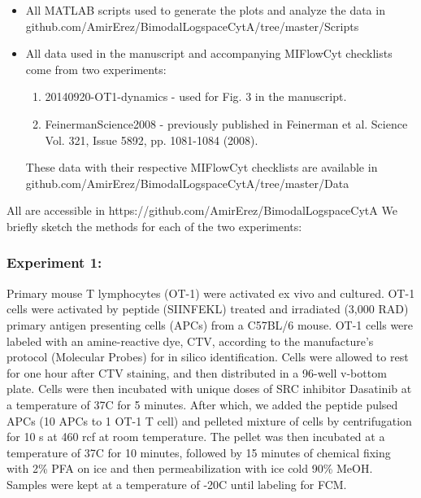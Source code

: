 \documentclass[11pt,a4paper,draft]{article}
\begin{document}
\smallskip
\begin{itemize}
\item All MATLAB scripts used to generate the plots and analyze the data in 
github.com/AmirErez/BimodalLogspaceCytA/tree/master/Scripts 
\item All data used in the manuscript and accompanying MIFlowCyt checklists come from two experiments:
	\begin{enumerate}
	\item 20140920-OT1-dynamics - used for Fig. 3 in the manuscript.
	\item FeinermanScience2008 - previously published in Feinerman et al. Science Vol. 321, Issue 5892, pp. 1081-1084 (2008). 
	\end{enumerate}
These data with their respective MIFlowCyt checklists are available in 
github.com/AmirErez/BimodalLogspaceCytA/tree/master/Data 
\end{itemize} 
All are accessible in 
https://github.com/AmirErez/BimodalLogspaceCytA
We briefly sketch the methods for each of the two experiments:
\subsubsection*{Experiment 1:} Primary mouse T lymphocytes (OT-1) were activated ex vivo and cultured. OT-1 cells were activated by peptide (SIINFEKL) treated and irradiated (3,000 RAD) primary antigen presenting cells (APCs) from a C57BL/6 mouse. OT-1 cells were labeled with an amine-reactive dye, CTV, according to the manufacture’s protocol (Molecular Probes) for in silico identification. Cells were allowed to rest for one hour after CTV staining, and then distributed in a 96-well v-bottom plate. Cells were then incubated with unique doses of SRC inhibitor Dasatinib at a temperature of 37C for 5 minutes. After which,  we added the peptide pulsed APCs (10 APCs to 1 OT-1 T cell) and pelleted mixture of cells by centrifugation for 10 s at 460 rcf at room temperature.  The pellet was then incubated at a temperature of 37C for 10 minutes, followed by 15 minutes of chemical fixing with 2\% PFA on ice and then permeabilization with ice cold 90\% MeOH. Samples were kept at a temperature of -20C until labeling for FCM.
\end{document}
